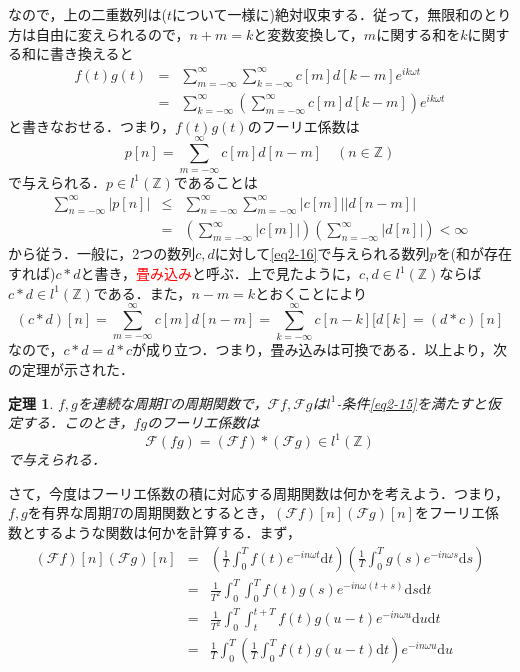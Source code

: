 \documentclass[a4j]{jsbook}
\newtheorem{theorem}{定理}
\numberwithin{theorem}{chapter}  %
\begin{document}
なので，上の二重数列は(\(t\)について一様に)絶対収束する．従って，無限和のとり方は自由に変えられるので，\(n+m=k\)と変数変換して，\(m\)に関する和を\(k\)に関する和に書き換えると
\begin{eqnarray*}
f(t)g(t)&=&\sum_{m=-\infty}^\infty\sum_{k=-\infty}^\infty c[m]d[k-m]e^{ik\omega t} \\
&=&\sum_{k=-\infty}^\infty\left(\sum_{m=-\infty}^\infty c[m]d[k-m]\right)e^{ik\omega t}
\end{eqnarray*}
と書きなおせる．つまり，\(f(t)g(t)\)のフーリエ係数は
\begin{equation}
    p[n]=\sum_{m=-\infty}^\infty c[m]d[n-m]\quad (n\in\mathbb{Z}) \label{eq2-16}
\end{equation}
で与えられる．\(p\in l^1(\mathbb{Z})\)であることは
\begin{eqnarray*}
\sum_{n=-\infty}^\infty |p[n]|&\leq&\sum_{n=-\infty}^\infty\sum_{m=-\infty}^\infty|c[m]||d[n-m]| \\
&=&\left(\sum_{m=-\infty}^\infty|c[m]|\right)\left(\sum_{n=-\infty}^\infty|d[n]|\right)<\infty
\end{eqnarray*}
から従う．一般に，2つの数列\(c, d\)に対して\eqref{eq2-16}で与えられる数列\(p\)を(和が存在すれば)\(c*d\)と書き，\textcolor{red}{畳み込み}と呼ぶ．上で見たように，\(c, d\in l^1(\mathbb{Z})\)ならば\(c*d\in l^1(\mathbb{Z})\)である．また，\(n-m=k\)とおくことにより
\begin{equation*}
    (c*d)[n]=\sum_{m=-\infty}^\infty c[m]d[n-m]=\sum_{k=-\infty}^\infty c[n-k][d[k]=(d*c)[n]
\end{equation*}
なので，\(c*d=d*c\)が成り立つ．つまり，畳み込みは可換である．以上より，次の定理が示された．
\begin{theorem}
\label{th2-11}
\(f, g\)を連続な周期\(T\)の周期関数で，\(\mathcal{F}f, \mathcal{F}g\)は\(l^1\)-条件\eqref{eq2-15}を満たすと仮定する．このとき，\(fg\)のフーリエ係数は
\begin{equation*}
    \mathcal{F}(fg)=(\mathcal{F}f)*(\mathcal{F}g)\in l^1(\mathbb{Z})
\end{equation*}
で与えられる．
\end{theorem}
さて，今度はフーリエ係数の積に対応する周期関数は何かを考えよう．つまり，\(f, g\)を有界な周期\(T\)の周期関数とするとき，\((\mathcal{F}f)[n](\mathcal{F}g)[n]\)をフーリエ係数とするような関数は何かを計算する．まず，
\begin{eqnarray*}
(\mathcal{F}f)[n](\mathcal{F}g)[n]&=&\left(\frac{1}{T}\int_0^T f(t)e^{-in\omega t}\mathrm{d}t\right)\left(\frac{1}{T}\int_0^T g(s)e^{-in\omega s}\mathrm{d}s\right) \\
&=&\frac{1}{T^2}\int_0^T\int_0^T f(t)g(s)e^{-in\omega(t+s)}\mathrm{d}s\mathrm{d}t \\
&=&\frac{1}{T^2}\int_0^T\int_t^{t+T} f(t)g(u-t)e^{-in\omega u}\mathrm{d}u\mathrm{d}t \\
&=&\frac{1}{T}\int_0^T\left(\frac{1}{T}\int_0^T f(t)g(u-t)\mathrm{d}t\right)e^{-in\omega u}\mathrm{d}u
\end{eqnarray*}
\end{document}
